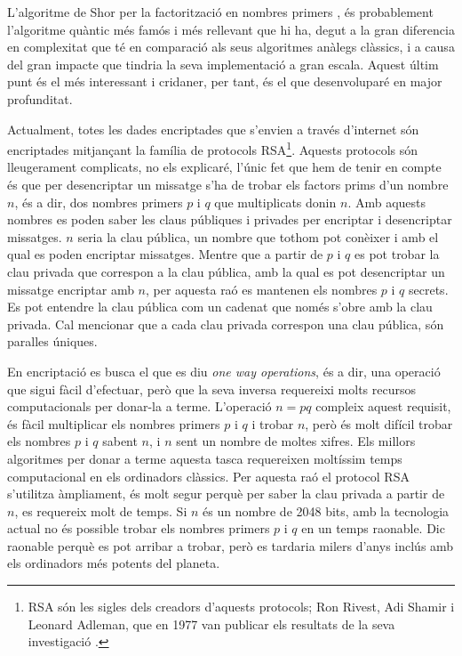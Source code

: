 L'algoritme de Shor per la factorització en nombres primers \cite{Shor_97}, és probablement l'algoritme quàntic més famós i més rellevant que hi ha, degut a la gran diferencia en complexitat que té en comparació als seus algoritmes anàlegs clàssics, i a causa del gran impacte que tindria la seva implementació a gran escala. Aquest últim punt és el més interessant i cridaner, per tant, és el que desenvoluparé en major profunditat.

Actualment, totes les dades encriptades que s'envien a través d'internet són encriptades mitjançant la família de protocols RSA\footnote{RSA són les sigles dels creadors d'aquests protocols; Ron Rivest, Adi Shamir i Leonard Adleman, que en 1977 van publicar els resultats de la seva investigació \cite{RSA}.}. Aquests protocols són lleugerament complicats, no els explicaré, l'únic fet que hem de tenir en compte és que per desencriptar un missatge s'ha de trobar els factors prims d'un nombre $n$, és a dir, dos nombres primers $p$ i $q$ que multiplicats donin $n$. Amb aquests nombres es poden saber les claus públiques i privades per encriptar i desencriptar missatges. $n$ seria la clau pública, un nombre que tothom pot conèixer i amb el qual es poden encriptar missatges. Mentre que a partir de $p$ i $q$ es pot trobar la clau privada que correspon a la clau pública, amb la qual es pot desencriptar un missatge encriptar amb $n$, per aquesta raó es mantenen els nombres $p$ i $q$ secrets. Es pot entendre la clau pública com un cadenat que només s'obre amb la clau privada. Cal mencionar que a cada clau privada correspon una clau pública, són paralles úniques.

En encriptació es busca el que es diu \textit{one way operations}, és a dir, una operació que sigui fàcil d'efectuar, però que la seva inversa requereixi molts recursos computacionals per donar-la a terme. L'operació $n = pq$ compleix aquest requisit, és fàcil multiplicar els nombres primers $p$ i $q$ i trobar $n$, però és molt difícil trobar els nombres $p$ i $q$ sabent $n$, i $n$ sent un nombre de moltes xifres. Els millors algoritmes per donar a terme aquesta tasca requereixen moltíssim temps computacional en els ordinadors clàssics. Per aquesta raó el protocol RSA s'utilitza àmpliament, és molt segur perquè per saber la clau privada a partir de $n$, es requereix molt de temps. Si $n$ és un nombre de 2048 bits, amb la tecnologia actual no és possible trobar els nombres primers $p$ i $q$ en un temps raonable. Dic raonable perquè es pot arribar a trobar, però es tardaria milers d'anys inclús amb els ordinadors més potents del planeta.


